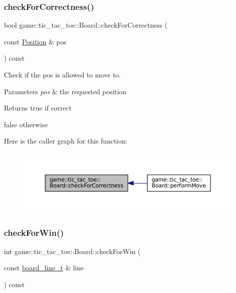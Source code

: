 \subsubsection{\texorpdfstring{check\+For\+Correctness()}{checkForCorrectness()}}
{\footnotesize\ttfamily bool game\+::tic\+\_\+tac\+\_\+toe\+::\+Board\+::check\+For\+Correctness (\begin{DoxyParamCaption}\item[{const \hyperlink{structgame_1_1_position}{Position} \&}]{pos }\end{DoxyParamCaption}) const\hspace{0.3cm}{\ttfamily [protected]}}



Check if the pos is allowed to move to. 


\begin{DoxyParams}{Parameters}
{\em pos} & the requested position \\
\hline
\end{DoxyParams}
\begin{DoxyReturn}{Returns}
true if correct 

false otherwise 
\end{DoxyReturn}
Here is the caller graph for this function\+:
\nopagebreak
\begin{figure}[H]
\begin{center}
\leavevmode
\includegraphics[width=350pt]{classgame_1_1tic__tac__toe_1_1_board_acd788fca5054228f6d44f4c0b5ffca1e_icgraph}
\end{center}
\end{figure}
\mbox{\label{classgame_1_1tic__tac__toe_1_1_board_ac100c056a65c288951f7ffec0f3fd4ad}} 
\subsubsection{\texorpdfstring{check\+For\+Win()}{checkForWin()}}
{\footnotesize\ttfamily int game\+::tic\+\_\+tac\+\_\+toe\+::\+Board\+::check\+For\+Win (\begin{DoxyParamCaption}\item[{const \hyperlink{namespacegame_1_1tic__tac__toe_a3959bb4b3346bd3cdbf5ae9a5c58cacb}{board\+\_\+line\+\_\+t} \&}]{line }\end{DoxyParamCaption}) const\hspace{0.3cm}{\ttfamily [protected]}}



